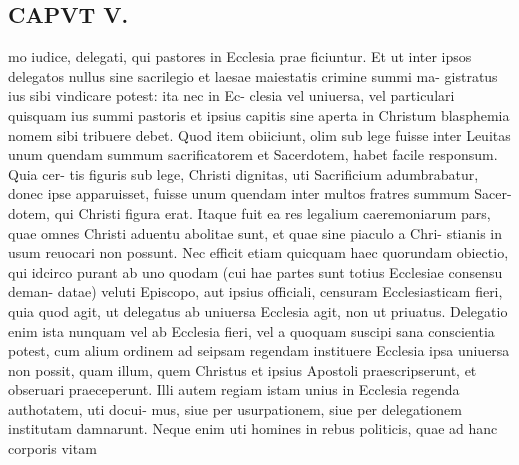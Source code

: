 \documentclass{article}
\begin{document}
\begin{pages}
\section*{CAPVT  V. }
\marginpar{[ p.243 ]}mo iudice, delegati, qui pastores in Ecclesia prae ficiuntur. Et ut inter ipsos delegatos nullus sine sacrilegio et laesae maiestatis crimine summi ma- gistratus ius sibi vindicare potest: ita nec in Ec- clesia vel uniuersa, vel particulari quisquam ius summi pastoris et ipsius capitis sine aperta in Christum blasphemia nomem sibi tribuere debet. Quod item obiiciunt, olim sub lege fuisse inter Leuitas unum quendam summum sacrificatorem et Sacerdotem, habet facile responsum. Quia cer- tis figuris sub lege, Christi dignitas, uti Sacrificium adumbrabatur, donec ipse apparuisset, fuisse unum quendam inter multos fratres summum Sacer- dotem, qui Christi figura erat. Itaque fuit ea res legalium caeremoniarum pars, quae omnes Christi aduentu abolitae sunt, et quae sine piaculo a Chri- stianis in usum reuocari non possunt. Nec efficit etiam quicquam haec quorundam obiectio, qui idcirco purant ab uno quodam (cui hae partes sunt totius Ecclesiae consensu deman- datae) veluti Episcopo, aut ipsius officiali, censuram Ecclesiasticam fieri, quia quod agit, ut delegatus ab uniuersa Ecclesia agit, non ut priuatus. Delegatio enim ista nunquam vel ab Ecclesia fieri, vel a quoquam suscipi sana conscientia potest, cum alium ordinem ad seipsam regendam instituere Ecclesia ipsa uniuersa non possit, quam illum, quem Christus et ipsius Apostoli praescripserunt, et obseruari praeceperunt. Illi autem regiam istam unius in Ecclesia regenda authotatem, uti docui- mus, siue per usurpationem, siue per delegationem institutam damnarunt. Neque enim uti homines in rebus politicis, quae ad hanc corporis vitam 

\end{pages}
\end{document}
